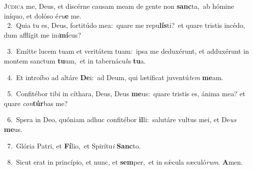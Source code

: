 \lettrine{\initial\textcolor{\initialcolor}{J}}{údica} me, Deus, et discérne causam meam de gente non \textbf{sanc}\-ta,~\star ab hómine iníquo, et dolóso é\-\textit{ru}\-\textbf{e} me.\\
{\numbfont\textcolor{\numbcolor}{~2.}}~Quia tu es, Deus, fortitúdo mea:~\dagger quare me repu\-\textbf{lís}\-ti?~\star et quare tristis incédo, dum afflígit me in\-\textit{i}\-\textbf{mí}cus?\par
{\numbfont\textcolor{\numbcolor}{~3.}}~Emítte lucem tuam et veritátem tuam:~\dagger ipsa me deduxérunt, et adduxérunt in montem sanctum \textbf{tu}\-um,~\star et in tabernácu\textit{la} \textbf{tu}\-a.\par
{\numbfont\textcolor{\numbcolor}{~4.}}~Et introíbo ad altáre \textbf{De}\-i:~\star ad Deum, qui lætíficat juventú\textit{tem} \textbf{me}\-am.\par
{\numbfont\textcolor{\numbcolor}{~5.}}~Confitébor tibi in cíthara, Deus, Deus \textbf{me}\-us:~\star quare tristis es, ánima mea? et quare \textit{con}\-\textbf{túr}bas me?\par
{\numbfont\textcolor{\numbcolor}{~6.}}~Spera in Deo, quóniam adhuc confitébor \textbf{il}\-li:~\star salutáre vultus mei, et De\textit{us} \textbf{me}\-us.\par
{\numbfont\textcolor{\numbcolor}{~7.}}~Glória Patri, et \textbf{Fí}\-lio,~\star et Spirítu\textit{i} \textbf{Sanc}\-to.\par
{\numbfont\textcolor{\numbcolor}{~8.}}~Sicut erat in princípio, et nunc, et \textbf{sem}\-per,~\star et in sǽcula sæculó\-\textit{rum}\-. \textbf{A}\-men.\par
